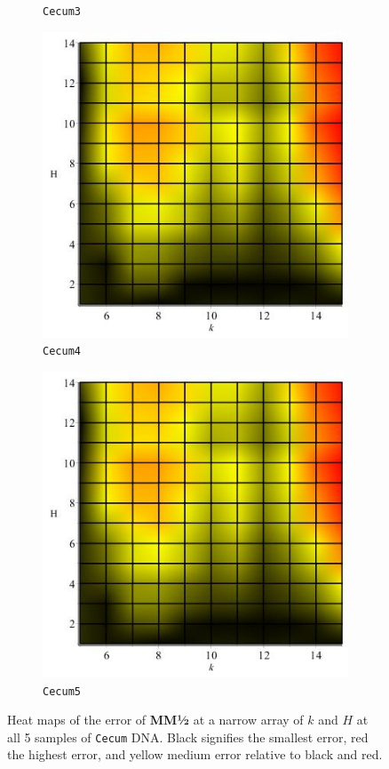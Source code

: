 \documentclass[../../main.tex]{subfiles}
\begin{document}
\begin{figure}[H]
\begin{subfigure}[b]{.5\textwidth}
\caption{\texttt{Cecum3}}
\end{subfigure}
\begin{subfigure}[b]{.5\textwidth}
\includegraphics[width=\textwidth]{precision/minmaxhalf/cecum4precise}
\caption{\texttt{Cecum4}}
\end{subfigure}
\begin{subfigure}[b]{.5\textwidth}
\includegraphics[width=\textwidth]{precision/minmaxhalf/cecum5precise}
\caption{\texttt{Cecum5}}
\end{subfigure}
\caption{Heat maps of the error of {\bf MM½} at a narrow array of $k$ and $H$ at all 5 samples of \texttt{Cecum} DNA. Black signifies the smallest error, red the highest error, and yellow medium error relative to black and red.}
\label{fig:cpreciseminmaxhalf}
\end{figure}
\end{document}
